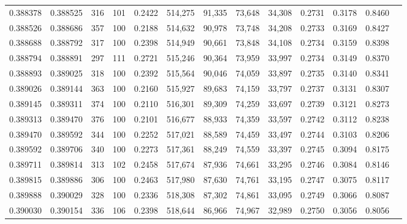\begin{tabular}{rrrrrrrrrrrrr}
0.388378 & 0.388525 &   316 & 101 &                                     0.2422 & 514,275 &  91,335 &  73,648 &  34,308 & 0.2731 & 0.3178 & 0.8460 \\
0.388526 & 0.388686 &   357 & 100 &                                     0.2188 & 514,632 &  90,978 &  73,748 &  34,208 & 0.2733 & 0.3169 & 0.8427 \\
0.388688 & 0.388792 &   317 & 100 &                                     0.2398 & 514,949 &  90,661 &  73,848 &  34,108 & 0.2734 & 0.3159 & 0.8398 \\
0.388794 & 0.388891 &   297 & 111 &                                     0.2721 & 515,246 &  90,364 &  73,959 &  33,997 & 0.2734 & 0.3149 & 0.8370 \\
0.388893 & 0.389025 &   318 & 100 &                                     0.2392 & 515,564 &  90,046 &  74,059 &  33,897 & 0.2735 & 0.3140 & 0.8341 \\
0.389026 & 0.389144 &   363 & 100 &                                     0.2160 & 515,927 &  89,683 &  74,159 &  33,797 & 0.2737 & 0.3131 & 0.8307 \\
0.389145 & 0.389311 &   374 & 100 &                                     0.2110 & 516,301 &  89,309 &  74,259 &  33,697 & 0.2739 & 0.3121 & 0.8273 \\
0.389313 & 0.389470 &   376 & 100 &                                     0.2101 & 516,677 &  88,933 &  74,359 &  33,597 & 0.2742 & 0.3112 & 0.8238 \\
0.389470 & 0.389592 &   344 & 100 &                                     0.2252 & 517,021 &  88,589 &  74,459 &  33,497 & 0.2744 & 0.3103 & 0.8206 \\
0.389592 & 0.389706 &   340 & 100 &                                     0.2273 & 517,361 &  88,249 &  74,559 &  33,397 & 0.2745 & 0.3094 & 0.8175 \\
0.389711 & 0.389814 &   313 & 102 &                                     0.2458 & 517,674 &  87,936 &  74,661 &  33,295 & 0.2746 & 0.3084 & 0.8146 \\
0.389815 & 0.389886 &   306 & 100 &                                     0.2463 & 517,980 &  87,630 &  74,761 &  33,195 & 0.2747 & 0.3075 & 0.8117 \\
0.389888 & 0.390029 &   328 & 100 &                                     0.2336 & 518,308 &  87,302 &  74,861 &  33,095 & 0.2749 & 0.3066 & 0.8087 \\
0.390030 & 0.390154 &   336 & 106 &                                     0.2398 & 518,644 &  86,966 &  74,967 &  32,989 & 0.2750 & 0.3056 & 0.8056 \\

\end{tabular}
